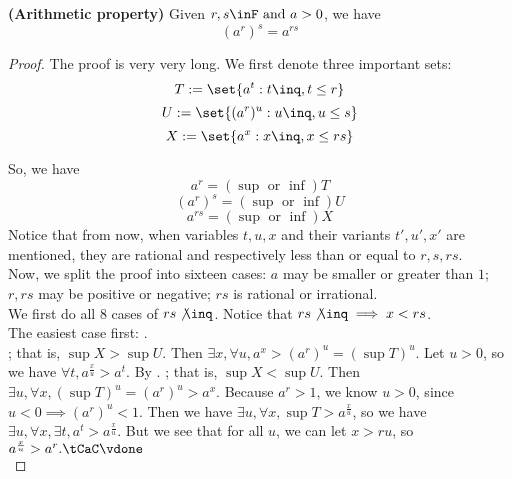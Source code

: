 \documentclass{report}
\begin{document}
\begin{theorem}
\label{1.4.14}
\textbf{(Arithmetic property)} Given $r,s\inF\text{ and }a>0$, we have
\begin{equation}
  (a^r)^s=a^{rs}
\end{equation}
\end{theorem}
\begin{proof}
  The proof is very very long. We first denote three important sets:
\begin{equation}
T:=\set{a^t:t\inq,t\leq r}
\end{equation}
\begin{equation}
U:=\set{(a^r)^u:u\inq,u\leq s}
\end{equation}
\begin{equation}
X:=\set{a^x:x\inq,x\leq rs}
\end{equation}

  So, we have 
\begin{equation}
a^r=(\sup \text{ or }\inf )T
\end{equation}
\begin{equation}
(a^r)^s=(\sup \text{ or }\inf )U
\end{equation}
\begin{equation}
a^{rs}=(\sup \text{ or }\inf )X
\end{equation}
Notice that from now, when variables $t,u,x$ and their variants $t',u',x'$ are mentioned, they are rational and respectively less than or equal to $r,s,rs$. \\



  Now, we split the proof into sixteen cases: $a$ may be smaller or greater than $1$; $r,rs$ may be positive or negative; $rs$ is rational or irrational. \\



  We first do all 8 cases of $rs\not\inq$. Notice that $rs\not\inq\implies x<rs$.\\  


  The easiest case first:  .\\

  ; that is, $\sup X>\sup U$. Then $\exists x,\forall u,a^x>(a^r)^u=(\sup T)^u$.  Let $u>0$, so we have $\forall t, a^{\frac{x}{u}}>a^t$. By  \CaC. ; that is, $\sup X<\sup U$. Then $\exists u,\forall x,(\sup T)^u=(a^r)^u>a^x$. Because $a^r>1$, we know $u>0$, since $u<0\implies (a^r)^u<1$. Then we have  $\exists u,\forall x,\sup T>a^{\frac{x}{u}}$, so we have $\exists u,\forall x,\exists t,a^t>a^{\frac{x}{u}}$. But we see that for all $u$, we can let  $x>ru$, so $a^{\frac{x}{u}}>a^r.\tCaC\vdone$   \\




\end{proof}
\end{document}
